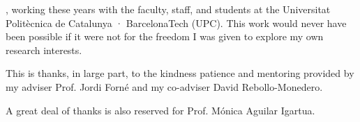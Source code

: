 
, working these years with the faculty, staff, and students at the Universitat Politècnica de Catalunya · BarcelonaTech (UPC). This work would never have been possible if it were not for the freedom I was given to explore my own research interests.

This is thanks, in large part, to the kindness patience and mentoring provided by my adviser Prof. Jordi Forn\'e and my co-adviser David Rebollo-Monedero.

A great deal of thanks is also reserved for Prof. M\'onica Aguilar Igartua.